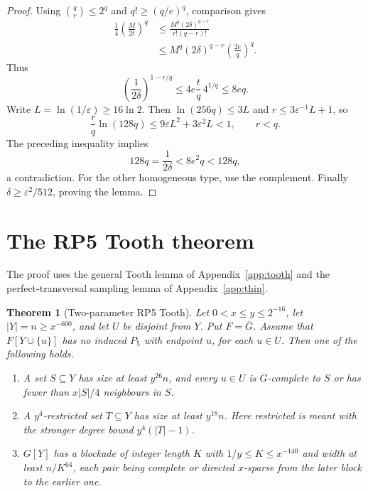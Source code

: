 \documentclass[11pt,a4paper]{article}
\newtheorem{theorem}{Theorem}[section]
\theoremstyle{definition}
\theoremstyle{remark}
\numberwithin{equation}{section}
\begin{document}
\begin{proof}
Using \(\binom qr\le2^q\) and \(q!\ge(q/e)^q\), comparison gives
\begin{align*}
 \frac14\left(\frac M{2t}\right)^q
 &\le\frac{M^q(2\delta)^{q-r}}{r!(q-r)!}\\
 &\le M^q(2\delta)^{q-r}\left(\frac{2e}q\right)^q.
\end{align*}
Thus
\[
 \left(\frac1{2\delta}\right)^{1-r/q}
 \le4e\frac tq\,4^{1/q}\le8eq.
\]
Write \(L=\ln(1/\varepsilon)\ge16\ln2\). Then \(\ln(256q)\le3L\) and \(r\le3\varepsilon^{-1}L+1\), so
\[
 \frac rq\ln(128q)\le9\varepsilon L^2+3\varepsilon^2L<1,
 \qquad r<q.
\]
The preceding inequality implies
\[
 128q=\frac1{2\delta}<8e^2q<128q,
\]
a contradiction. For the other homogeneous type, use the complement. Finally \(\delta\ge\varepsilon^2/512\), proving the lemma.
\end{proof}


\section{The RP5 Tooth theorem}\label{app:rp5}

The proof uses the general Tooth lemma of Appendix~\ref{app:tooth} and the perfect-transversal sampling lemma of Appendix~\ref{app:thin}.

\begin{theorem}[Two-parameter RP5 Tooth]\label{thm:rp5}
Let \(0<x\le y\le 2^{-16}\), let \(|Y|=n\ge x^{-600}\), and let \(U\) be disjoint from \(Y\). Put \(F=\overline{G}\). Assume that \(F[Y\cup\{u\}]\) has no induced \(P_{5}\) with endpoint \(u\), for each \(u\in U\). Then one of the following holds.
\begin{enumerate}[label=(\Alph*)]
\item A set \(S \subseteq Y\) has size at least \(y^{26} n\), and every \(u\in U\) is \(G\)-complete to \(S\) or has fewer than \(x|S|/4\) neighbours in \(S\).
\item A \(y^{4}\)-restricted set \(T \subseteq Y\) has size at least \(y^{18} n\). Here restricted is meant with the stronger degree bound \(y^{4}(|T|-1)\).
\item \(G[Y]\) has a blockade of integer length \(K\) with \(1/y\le K\le x^{-140}\) and width at least \(n/K^{64}\), each pair being complete or directed \(x\)-sparse from the later block to the earlier one.
\end{enumerate}


\end{theorem}
\end{document}
